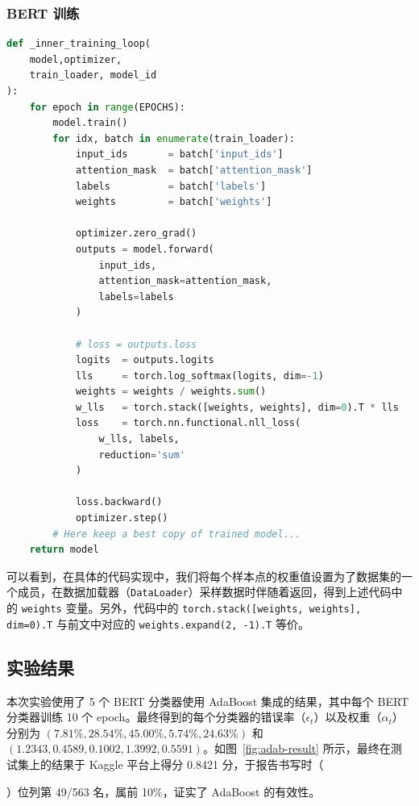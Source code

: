 \documentclass[12pt, a4paper, UTF8]{ctexart}
\begin{document}
\subsubsection{BERT 训练}
\label{sec:adab-code-training}

\begin{small}
\begin{lstlisting}[language=Python]
def _inner_training_loop(
    model,optimizer,
    train_loader, model_id
):
    for epoch in range(EPOCHS):
        model.train()
        for idx, batch in enumerate(train_loader):
            input_ids       = batch['input_ids']
            attention_mask  = batch['attention_mask']
            labels          = batch['labels']
            weights         = batch['weights']

            optimizer.zero_grad()
            outputs = model.forward(
                input_ids,
                attention_mask=attention_mask,
                labels=labels
            )
            
            # loss = outputs.loss
            logits  = outputs.logits
            lls     = torch.log_softmax(logits, dim=-1)
            weights = weights / weights.sum()
            w_lls   = torch.stack([weights, weights], dim=0).T * lls
            loss    = torch.nn.functional.nll_loss(
                w_lls, labels,
                reduction='sum'
            )

            loss.backward()
            optimizer.step()
        # Here keep a best copy of trained model...
    return model
\end{lstlisting}
\end{small}

可以看到，在具体的代码实现中，我们将每个样本点的权重值设置为了数据集的一个成员，在数据加载器（\verb|DataLoader|）采样数据时伴随着返回，得到上述代码中的 \verb|weights| 变量。另外，代码中的 \verb|torch.stack([weights, weights], dim=0).T| 与前文中对应的 \verb|weights.expand(2, -1).T| 等价。



\subsection{实验结果}
本次实验使用了 5 个 BERT 分类器使用 AdaBoost 集成的结果，其中每个 BERT 分类器训练 10 个 epoch。最终得到的每个分类器的错误率（$\epsilon_t$）以及权重（$\alpha_t$）分别为 $(7.81\%, 28.54\%, 45.00\%, 5.74\%, 24.63\%)$ 和 $(1.2343, 0.4589, 0.1002, 1.3992,0.5591)$。如图~\ref{fig:adab-result} 所示，最终在测试集上的结果于 Kaggle 平台上得分 0.8421 分，于报告书写时（\date{\today}）位列第 49/563 名，属前 10\%，证实了 AdaBoost 的有效性。
\end{document}

